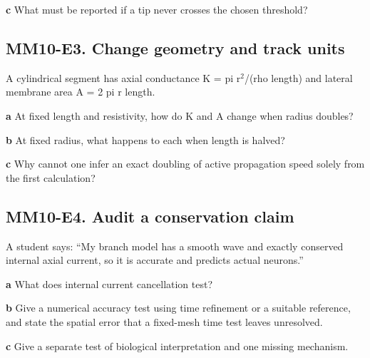 \documentclass[11pt,letterpaper]{article}
\theoremstyle{definition}\newtheorem{definition}{Definition}\newtheorem{example}{Example}
\numberwithin{equation}{section}
\begin{document}
\textbf{c} What must be reported if a tip never crosses the chosen threshold?

\par\noindent\begin{minipage}{\linewidth}
\subsection*{MM10-E3. Change geometry and track units}
A cylindrical segment has axial conductance K =\allowbreak{} pi r$^2$/(rho length) and lateral membrane area A =\allowbreak{} 2 pi r length.

\textbf{a} At fixed length and resistivity, how do K and A change when radius doubles?

\end{minipage}\par\medskip
\textbf{b} At fixed radius, what happens to each when length is halved?

\textbf{c} Why cannot one infer an exact doubling of active propagation speed solely from the first calculation?

\par\noindent\begin{minipage}{\linewidth}
\subsection*{MM10-E4. Audit a conservation claim}
A student says: ``My branch model has a smooth wave and exactly conserved internal axial current, so it is accurate and predicts actual neurons.''

\textbf{a} What does internal current cancellation test?

\end{minipage}\par\medskip
\textbf{b} Give a numerical accuracy test using time refinement or a suitable reference, and state the spatial error that a fixed-mesh time test leaves unresolved.

\textbf{c} Give a separate test of biological interpretation and one missing mechanism.
\end{document}
